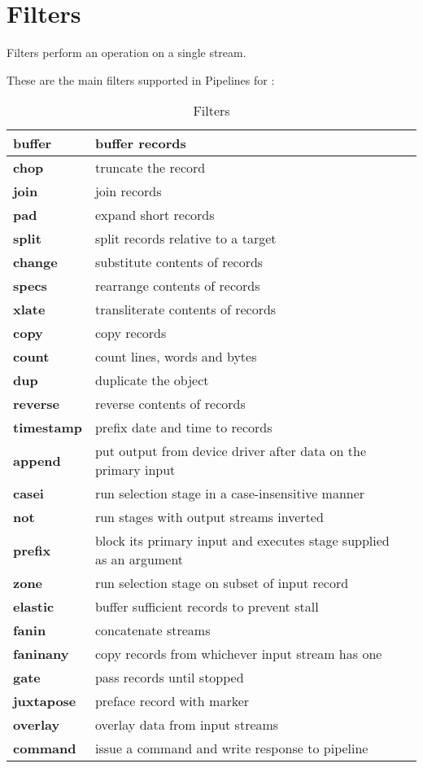 \section{Filters}

Filters perform an operation on a single stream.

These are the main filters supported in Pipelines for \nr{}:

\begin{longtable}[l]{|l|p{10cm}|l|}
\caption{ Filters } \\
\hline
\textbf{buffer}&buffer records \\
\hline
\textbf{chop}&truncate the record \\
\hline
\textbf{join}&join records \\
\hline
\textbf{pad}&expand short records \\
\hline
\textbf{split}&split records relative to a target \\
\hline
\textbf{change}&substitute contents of records \\
\hline
\textbf{specs}&rearrange contents of records \\
\hline
\textbf{xlate}&transliterate contents of records \\
\hline
\textbf{copy}&copy records \\
\hline
\textbf{count}&count lines, words and bytes \\
\hline
\textbf{dup}&duplicate the object \\
\hline
\textbf{reverse}&reverse contents of records \\
\hline
\textbf{timestamp}&prefix date and time to records \\
\hline
\textbf{append}&put output from device driver after data on the primary input \\
\hline
\textbf{casei}&run selection stage in a case-insensitive manner \\
\hline
\textbf{not}&run stages with output streams inverted \\
\hline
\textbf{prefix}&block its primary input and executes stage supplied as an argument \\
\hline
\textbf{zone}&run selection stage on subset of input record \\
\hline
\textbf{elastic}&buffer sufficient records to prevent stall \\
\hline
\textbf{fanin}&concatenate streams \\
\hline
\textbf{faninany}&copy records from whichever input stream has one \\
\hline
\textbf{gate}&pass records until stopped \\
\hline
\textbf{juxtapose}&preface record with marker \\
\hline
\textbf{overlay}&overlay data from input streams \\
\hline
\textbf{command}&issue a command and write response to pipeline \\
\hline
\end{longtable}



